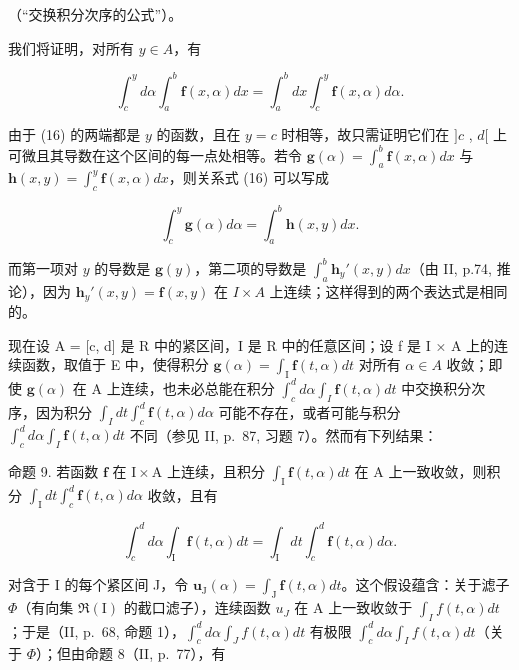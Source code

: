 （“交换积分次序的公式”）。

我们将证明，对所有 \(y \in A\)，有

\[
\int_ {c} ^ {y} d \alpha \int_ {a} ^ {b} \mathbf {f} (x, \alpha) d x = \int_ {a} ^ {b} d x \int_ {c} ^ {y} \mathbf {f} (x, \alpha) d \alpha .\tag{16}
\]

由于 (16) 的两端都是 \(y\) 的函数，且在 \(y = c\) 时相等，故只需证明它们在 \(]c\) , \(d[\) 上可微且其导数在这个区间的每一点处相等。若令 \(\mathbf{g}(\alpha) = \int_{a}^{b} \mathbf{f}(x, \alpha) dx\) 与 \(\mathbf{h}(x, y) = \int_{c}^{y} \mathbf{f}(x, \alpha) dx\)，则关系式 (16) 可以写成

\[
\int_ {c} ^ {y} \mathbf {g} (\alpha) d \alpha = \int_ {a} ^ {b} \mathbf {h} (x, y) d x.
\]

而第一项对 \(y\) 的导数是 \(\mathbf{g}(y)\)，第二项的导数是 \(\int_{a}^{b} \mathbf{h}_{y}'(x, y) dx\)（由 II, p.74, 推论），因为 \(\mathbf{h}_{y}'(x, y) = \mathbf{f}(x, y)\) 在 \(I \times A\) 上连续；这样得到的两个表达式是相同的。

现在设 A = {[}c, d{]} 是 R 中的紧区间，I 是 R 中的任意区间；设 f 是 I × A 上的连续函数，取值于 E 中，使得积分 \(\mathbf{g}(\alpha) = \int_{\mathrm{I}} \mathbf{f}(t, \alpha) dt\) 对所有 \(\alpha \in A\) 收敛；即使 \(\mathbf{g}(\alpha)\) 在 A 上连续，也未必总能在积分 \(\int_{c}^{d} d\alpha \int_{I} \mathbf{f}(t, \alpha) dt\) 中交换积分次序，因为积分 \(\int_{I} dt \int_{c}^{d} \mathbf{f}(t, \alpha) d\alpha\) 可能不存在，或者可能与积分 \(\int_{c}^{d} d\alpha \int_{I} \mathbf{f}(t, \alpha) dt\) 不同（参见 II, p.~87, 习题 7）。然而有下列结果：

命题 9. 若函数 \(\mathbf{f}\) 在 \(\mathrm{I} \times \mathrm{A}\) 上连续，且积分 \(\int_{\mathrm{I}} \mathbf{f}(t, \alpha) dt\) 在 \(\mathrm{A}\) 上一致收敛，则积分 \(\int_{\mathrm{I}} dt \int_{c}^{d} \mathbf{f}(t, \alpha) d\alpha\) 收敛，且有

\[
\int_ {c} ^ {d} d \alpha \int_ {\mathrm{I}} \mathbf {f} (t, \alpha) d t = \int_ {\mathrm{I}} d t \int_ {c} ^ {d} \mathbf {f} (t, \alpha) d \alpha .\tag{17}
\]

对含于 I 的每个紧区间 J，令 \(\mathbf{u}_{\mathrm{J}}(\alpha) = \int_{\mathrm{J}} \mathbf{f}(t, \alpha) dt\)。这个假设蕴含：关于滤子 \(\Phi\)（有向集 \(\Re(\mathrm{I})\) 的截口滤子），连续函数 \(u_{J}\) 在 A 上一致收敛于 \(\int_{I} f(t, \alpha) dt\)；于是（II, p.~68, 命题 1），\(\int_{c}^{d} d\alpha \int_{J} f(t, \alpha) dt\) 有极限 \(\int_{c}^{d} d\alpha \int_{I} f(t, \alpha) dt\)（关于 \(\Phi\)）；但由命题 8（II, p.~77），有

